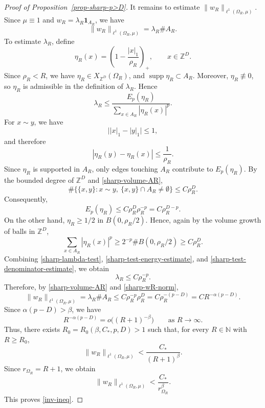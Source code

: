 \documentclass[twoside,12pt,letter]{article}
\theoremstyle{plain}
\theoremstyle{definition}
\theoremstyle{remark}
\numberwithin{equation}{section}
\begin{document}
\begin{proof}[Proof of Proposition~\ref{prop-sharp-p>D}]
It remains to estimate \(\|w_R\|_{\ell^1(\Omega_R,\mu)}\). Since
\(\mu\equiv 1\) and \(w_R=\lambda_R\mathbf{1}_{A_R}\), we have
\begin{equation}\label{sharp-wR-norm}
\|w_R\|_{\ell^1(\Omega_R,\mu)}
=
\lambda_R\#A_R.
\end{equation}
To estimate \(\lambda_R\), define
\[
\eta_R(x)
=
\left(1-\frac{|x|_1}{\rho_R}\right)_+,
\qquad x\in\mathbb{Z}^D.
\]
Since \(\rho_R<R\), we have \(\eta_R\in X_{\mathbb{Z}^D}(\Omega_R)\), and
\(\operatorname{supp}\eta_R\subset A_R\). Moreover, \(\eta_R\not\equiv 0\), so
\(\eta_R\) is admissible in the definition of \(\lambda_R\). Hence
\begin{equation}\label{sharp-lambda-test}
\lambda_R
\le
\frac{E_p(\eta_R)}
{\displaystyle\sum_{x\in A_R}|\eta_R(x)|^p}.
\end{equation}
For \(x\sim y\), we have
\[
\bigl||x|_1-|y|_1\bigr|\le 1,
\]
and therefore
\[
|\eta_R(y)-\eta_R(x)|
\le
\frac{1}{\rho_R}.
\]
Since \(\eta_R\) is supported in \(A_R\), only edges touching \(A_R\) contribute
to \(E_p(\eta_R)\). By the bounded degree of \(\mathbb{Z}^D\) and
\eqref{sharp-volume-AR},
\[
\#\bigl\{\{x,y\}:x\sim y,\ \{x,y\}\cap A_R\neq\emptyset\bigr\}
\le C\rho_R^D.
\]
Consequently,
\begin{equation}\label{sharp-test-energy-estimate}
E_p(\eta_R)
\le
C\rho_R^D\rho_R^{-p}
=
C\rho_R^{D-p}.
\end{equation}
On the other hand, \(\eta_R\ge 1/2\) in \(B(0,\rho_R/2)\). Hence, again by the
volume growth of balls in \(\mathbb{Z}^D\),
\begin{equation}\label{sharp-test-denominator-estimate}
\sum_{x\in A_R}|\eta_R(x)|^p
\ge
2^{-p}\#B(0,\rho_R/2)
\ge
C\rho_R^D.
\end{equation}
Combining \eqref{sharp-lambda-test}, \eqref{sharp-test-energy-estimate}, and
\eqref{sharp-test-denominator-estimate}, we obtain
\[
\lambda_R\le C\rho_R^{-p}.
\]
Therefore, by \eqref{sharp-volume-AR} and \eqref{sharp-wR-norm},
\[
\|w_R\|_{\ell^1(\Omega_R,\mu)}
=
\lambda_R\#A_R
\le
C\rho_R^{-p}\rho_R^D
=
C\rho_R^{-(p-D)}
=
C R^{-\alpha(p-D)}.
\]
Since \(\alpha(p-D)>\beta\), we have
\[
R^{-\alpha(p-D)}
=
o\bigl((R+1)^{-\beta}\bigr)
\qquad \text{as } R\to\infty.
\]
Thus, there exists \(R_0=R_0(\beta,C_*,p,D)>1\) such that, for every
\(R\in\mathbb{N}\) with \(R\ge R_0\),
\[
\|w_R\|_{\ell^1(\Omega_R,\mu)}
<
\frac{C_*}{(R+1)^\beta}.
\]
Since \(r_{\Omega_R}=R+1\), we obtain
\[
\|w_R\|_{\ell^1(\Omega_R,\mu)}
<
\frac{C_*}{r_{\Omega_R}^{\beta}}.
\]
This proves \eqref{inv-ineq}.
\end{proof}
\end{document}
